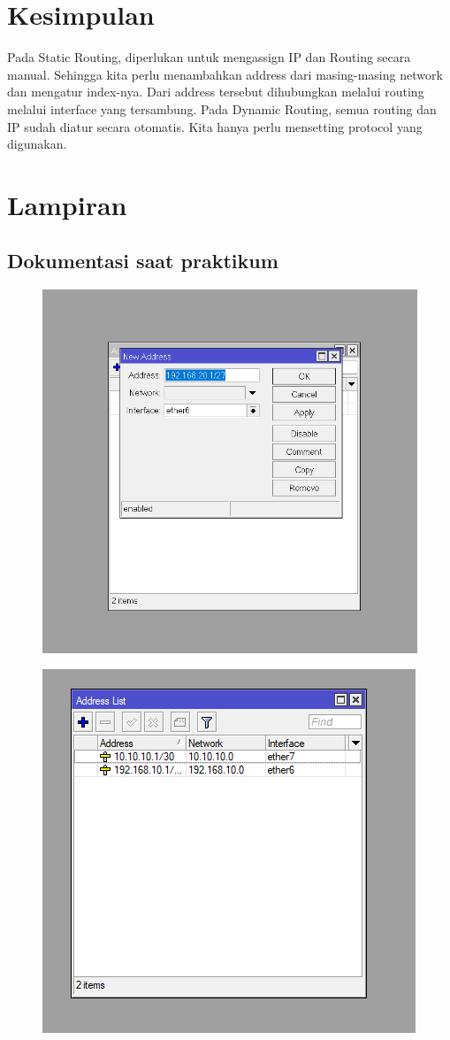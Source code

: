 \section{Kesimpulan}
Pada Static Routing, diperlukan untuk mengassign IP dan Routing secara manual. Sehingga kita perlu menambahkan address dari masing-masing network dan mengatur index-nya. Dari address tersebut dihubungkan melalui routing melalui interface yang tersambung.
Pada Dynamic Routing, semua routing dan IP sudah diatur secara otomatis. Kita hanya perlu mensetting protocol yang digunakan.

\section{Lampiran}
\subsection{Dokumentasi saat praktikum}
\begin{figure}[H]
    \centering
    \includegraphics[width=0.5\linewidth]{P1/img/Address Laptop Router 2.png}
    \label{fig:enter-label}
\end{figure}
\begin{figure}[H]
    \centering
    \includegraphics[width=0.5\linewidth]{P1/img/address list static.png}
    \label{fig:enter-label}
\end{figure}
